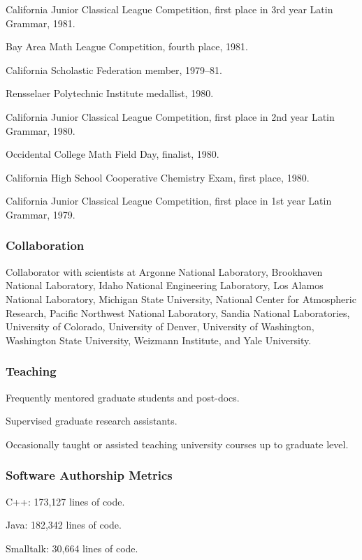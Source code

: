 \documentclass[]{article}
\begin{document}
California Junior Classical League Competition, first place in 3rd year
Latin Grammar, 1981.

Bay Area Math League Competition, fourth place, 1981.

California Scholastic Federation member, 1979--81.

Rensselaer Polytechnic Institute medallist, 1980.

California Junior Classical League Competition, first place in 2nd year
Latin Grammar, 1980.

Occidental College Math Field Day, finalist, 1980.

California High School Cooperative Chemistry Exam, first place, 1980.

California Junior Classical League Competition, first place in 1st year
Latin Grammar, 1979.

\subsubsection{Collaboration}\label{collaboration}

Collaborator with scientists at Argonne National Laboratory, Brookhaven
National Laboratory, Idaho National Engineering Laboratory, Los Alamos
National Laboratory, Michigan State University, National Center for
Atmospheric Research, Pacific Northwest National Laboratory, Sandia
National Laboratories, University of Colorado, University of Denver,
University of Washington, Washington State University, Weizmann
Institute, and Yale University.

\subsubsection{Teaching}\label{teaching}

Frequently mentored graduate students and post-docs.

Supervised graduate research assistants.

Occasionally taught or assisted teaching university courses up to
graduate level.

\subsubsection{Software Authorship
Metrics}\label{software-authorship-metrics}

C++: 173,127 lines of code.

Java: 182,342 lines of code.

Smalltalk: 30,664 lines of code.
\end{document}
